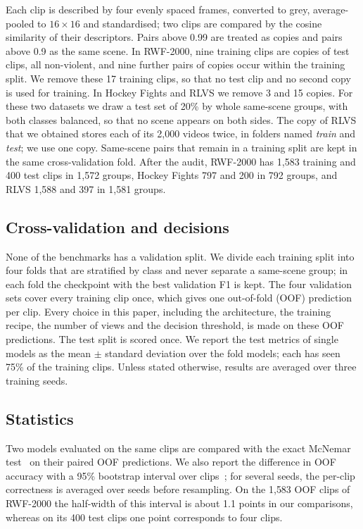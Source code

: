 \documentclass[conference]{IEEEtran}
\begin{document}
Each clip is described by four evenly spaced frames, converted to grey,
average-pooled to $16\times16$ and standardised; two clips are compared by
the cosine similarity of their descriptors. Pairs above 0.99 are treated as
copies and pairs above 0.9 as the same scene. In RWF-2000, nine training
clips are copies of test clips, all non-violent, and nine further pairs of
copies occur within the training split. We remove these 17 training clips,
so that no test clip and no second copy is used for training. In Hockey
Fights and RLVS we remove 3 and 15 copies. For these two datasets we draw a
test set of 20\% by whole same-scene groups, with both classes balanced,
so that no scene appears on both sides. The copy of RLVS that we obtained
stores each of its 2{,}000 videos twice, in folders named \emph{train} and
\emph{test}; we use one copy. Same-scene pairs that remain in a training split are kept in the same
cross-validation fold. After the audit, RWF-2000 has 1{,}583 training and
400 test clips in 1{,}572 groups, Hockey Fights 797 and 200 in 792 groups,
and RLVS 1{,}588 and 397 in 1{,}581 groups.


\subsection{Cross-validation and decisions}

None of the benchmarks has a validation split. We divide each training
split into four folds that are stratified by class and never separate a
same-scene group; in each fold the checkpoint with the best validation F1
is kept. The four validation sets cover every training clip once, which
gives one out-of-fold (OOF) prediction per clip. Every choice in this
paper, including the architecture, the training recipe, the number of views
and the decision threshold, is made on these OOF predictions. The test
split is scored once. We report the test metrics of single models as the
mean $\pm$ standard deviation over the fold models; each has seen 75\% of
the training clips. Unless stated otherwise, results are averaged over
three training seeds.

\subsection{Statistics}

Two models evaluated on the same clips are compared with the exact McNemar
test~\cite{mcnemar} on their paired OOF predictions. We also report the
difference in OOF accuracy with a 95\% bootstrap interval over
clips~\cite{bootstrap}; for several seeds, the per-clip correctness is
averaged over seeds before resampling. On the 1{,}583 OOF clips of
RWF-2000 the half-width of this interval is about 1.1 points in our
comparisons, whereas on its 400 test clips one point corresponds to four
clips.
\end{document}
